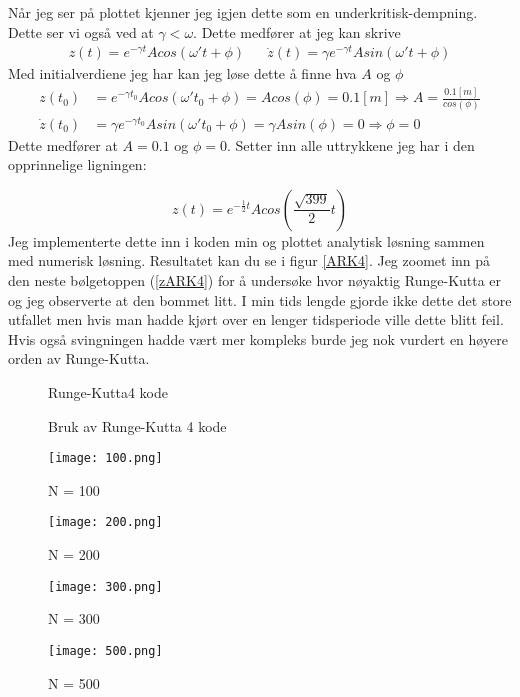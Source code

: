 \documentclass[a4paper,12pt,norsk]{article}
\begin{document}
\begin{enumerate}[label=(\alph*)]
Når jeg ser på plottet kjenner jeg igjen dette som en underkritisk-dempning. Dette ser vi også ved at $\gamma < \omega$. Dette medfører at jeg kan skrive 
\begin{align*}
z(t) = e^{-\gamma t}Acos(\omega't + \phi) 
&& \dot{z}(t) =\gamma e^{-\gamma t}Asin(\omega't + \phi) 
\end{align*}
Med initialverdiene jeg har kan jeg løse dette å finne hva $A$ og $\phi$
\begin{align*}
z(t_0) &= e^{-\gamma t_0}Acos(\omega't_0 + \phi) = Acos(\phi) = 0.1 [m] \Rightarrow A = \frac{0.1[m]}{cos(\phi)}\\
\dot{z}(t_0) &= \gamma e^{-\gamma t_0}Asin(\omega't_0 + \phi) = \gamma Asin(\phi) = 0 \Rightarrow \phi = 0
\end{align*} 
Dette medfører at $A = 0.1$ og $\phi = 0$. Setter inn alle uttrykkene jeg har i den opprinnelige ligningen:

$$
z(t) = e^{- \frac{1}{2}t}Acos\left(\frac{\sqrt{399}}{2}t \right)
$$
Jeg implementerte dette inn i koden min og plottet analytisk løsning sammen med numerisk løsning. Resultatet kan du se i figur \vref{ARK4}. Jeg zoomet inn på den neste bølgetoppen (\vref{zARK4}) for å undersøke hvor nøyaktig Runge-Kutta er og jeg observerte at den bommet litt. I min tids lengde gjorde ikke dette det store utfallet men hvis man hadde kjørt over en lenger tidsperiode ville dette blitt feil. Hvis også svingningen hadde vært mer kompleks burde jeg nok vurdert en høyere orden av Runge-Kutta. 

\begin{figure}[h!]
\caption{Runge-Kutta4 kode}

\label{RK4}
\end{figure}
\begin{figure}[h!]
\caption{Bruk av Runge-Kutta 4 kode}

\label{bRK4}
\end{figure}



\begin{figure}[h!]
\begin{minipage}[b]{0.5\linewidth}
\centering
\texttt{[image: 100.png]} 
\caption{N = 100}
\label{100}
\end{minipage}
\hspace{0.5cm}
\begin{minipage}[b]{0.5\linewidth}
\centering
\texttt{[image: 200.png]} 
\caption{N = 200}
\label{200}
\end{minipage}
\hspace{0.5cm}
\begin{minipage}[b]{0.5\linewidth}
\centering
\texttt{[image: 300.png]} 
\caption{N = 300}
\label{300}
\end{minipage}
\hspace{0.5cm}
\begin{minipage}[b]{0.5\linewidth}
\centering
\texttt{[image: 500.png]} 
\caption{N = 500}
\label{500}
\end{minipage}
\end{figure}


\end{enumerate}
\end{document}
